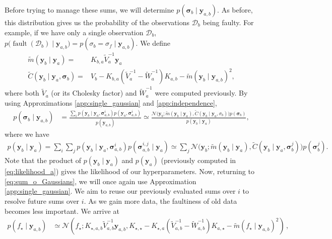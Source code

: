 \documentclass{article} %
\newcommand{\given}{\!\ensuremath{\mid}\!}
\newcommand{\cm}[1]{\ensuremath{\mathcal{#1}}}
\newcommand{\bm}[1]{\ensuremath{\mathbf{#1}}}
\newcommand{\data}{\ensuremath{\cm{D}}}
\newcommand{\vect}[1]{\bm{#1}}
\newcommand{\vy}{\vect{y}}
\newcommand{\vs}{\vect{\sigma}}
\newcommand{\amean}[2]{\tilde{{m}}(#1 \given #2 )}
\newcommand{\acov}[2]{\tilde{{C}}(#1 \given #2 )}
\newcommand{\p}[2]{p(#1\given#2)}
\newcommand{\fPr}{p}
\newcommand{\Prob}[2]{\fPr(#1 \given #2 )}
\newcommand{\ps}[2]{p(#1\vert#2)}
\newcommand{\N}[3]{\cm{N}( #1;#2,#3 )}
\newcommand{\st}{_{\star}}
\newcommand{\defequal}{=}
\DeclareMathOperator{\fault}{fault}
\begin{document}
Before trying to manage these sums, we will determine $p(\vs_b \given \vy_{a,b})$. As before, this distribution gives us the probability
of the observations $\data_b$ being faulty. For example, if we have
only a single observation $\data_b$, $
p\bigl(\fault(\data_b) \given \vy_{a,b}\bigr) = \Prob{\sigma_b =
  \sigma_f}{\vy_{a,b}} $. We define
\begin{align*}%
\amean{\vy_b}{\vy_a} \defequal {} &
K_{b,a} \tilde{V}_a^{-1} \vy_a %
\\
\acov{\vy_b}{\vy_{a},\vs_b}
\defequal {} & V_b - K_{b,a}(\tilde{V}_a^{-1}-\tilde{W}_a^{-1})K_{a,b}
 - \amean{\vy_b}{\vy_{a,b}}^2, %
\end{align*}
where both $\tilde{V}_a$ (or its Cholesky factor) and
$\tilde{W}_a^{-1}$ were computed previously. By using
Approximations \ref{app:single_gaussian} and \ref{app:independence},
\begin{align*}
\Prob{\vs_b}{\vy_{a,b}} & = \frac{\sum_i \p{\vy_b}{\vy_a,\vs^i_{a,b}}p(\vy_a,\vs^i_{a,b})}{p(\vy_{a,b})} 
\simeq \frac{\cm{N}\bigl(\vy_b; \amean{\vy_b}{\vy_a}, \acov{\vy_b}{\vy_a, \sigma_b}\bigr) \fPr(\vs_b)}{\p{\vy_{b}}{\vy_a}},%
\end{align*}
where we have
\begin{align*}
p(\vy_{b} \given \vy_a)
 = \sum_i \sum_j \p{\vy_b}{\vy_a,\vs^i_{a,b}}\Prob{\vs^{i,j}_{a,b}}{\vy_a}
 \simeq \sum_j \cm{N}\bigl(\vy_b; \amean{\vy_b}{\vy_a}, \acov{\vy_b}{\vy_a, \vs_b^j}\bigr) \fPr(\vs_b^j).%
\end{align*}
Note that the product of $p(\vy_{b} \given \vy_a)$ and $p(\vy_a)$ (previously computed in
\eqref{eq:likelihood_a}) gives the likelihood of our hyperparameters. Now, returning to \eqref{eq:sum_o_Gaussians}, we will once again
use Approximation \ref{app:single_gaussian}. We aim to reuse our previously evaluated sums over
$i$ to resolve future sums over $i$. As we gain more data, the
faultiness of old data becomes less important. We arrive at
\begin{align}
\p{f\st}{\vy_{a,b}} & \simeq \N{f\st}{K_{\star,a,b} \tilde{V}_{a,b}^{-1} \vy_{a,b}}{K_{\star,\star} - K_{\star,a}(\tilde{V}_{a,b}^{-1}-\tilde{W}_{a,b}^{-1})K_{a,\star} - \amean{f\st}{\vy_{a,b}}^2}\,,\label{eq:pyab}
\end{align}
\end{document}
